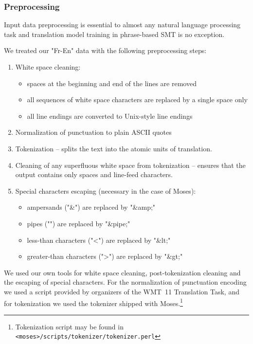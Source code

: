 \subsubsection*{Preprocessing}

Input data preprocessing is essential to almost any natural language processing task
and translation model training in phrase-based SMT is no exception.

We treated our "Fr-En" data with the following preprocessing steps:
\begin{enumerate}
  \item White space cleaning:
  \begin{itemize}
    \item spaces at the beginning and end of the lines are removed
    \item all sequences of white space characters are replaced by a single space only
    \item all line endings are converted to Unix-style line endings
  \end{itemize}
  \item Normalization of punctuation to plain ASCII quotes
  \item Tokenization -- splits the text into the atomic units of translation.
  \item Cleaning of any superfluous white space from tokenization -- ensures that the output contains only spaces and line-feed characters.
  \item Special characters escaping (necessary in the case of Moses):
  \begin{itemize}
    \item ampersands ("\&") are replaced by "\&amp;"
    \item pipes ("\textbar") are replaced by "\&pipe;"
    \item less-than characters ("<") are replaced by "\&lt;"
    \item greater-than characters (">") are replaced by "\&gt;"
  \end{itemize}
\end{enumerate}

We used our own tools for white space cleaning, post-tokenization cleaning
and the escaping of special characters.
For the normalization of punctuation encoding we used a script provided by organizers of
the WMT~11 Translation Task,
and for tokenization we used the tokenizer shipped with
Moses.\footnote{Tokenization script may be found in \texttt{<moses>/scripts/tokenizer/tokenizer.perl}}

